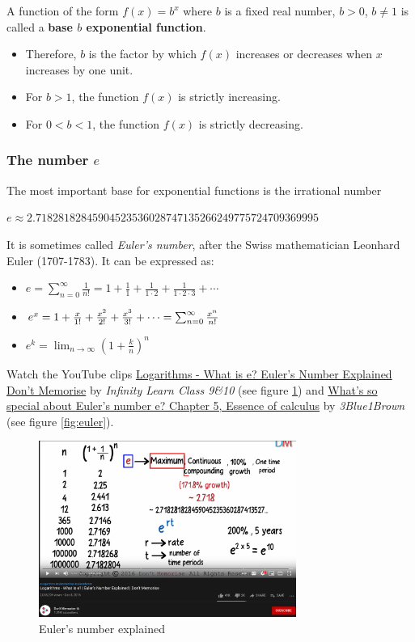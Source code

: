 \documentclass[
  12pt,
  oneside]{book}
\providecommand{\tightlist}{%
  \setlength{\itemsep}{0pt}\setlength{\parskip}{0pt}}
\theoremstyle{definition}
\theoremstyle{definition}
\theoremstyle{definition}
\theoremstyle{definition}
\theoremstyle{remark}
\begin{document}
A function of the form \(f(x) = b^{x}\) where \(b\) is a fixed real number, \(b > 0\), \(b \neq 1\) is called a \textbf{base \(b\) exponential function}.

\begin{itemize}
\tightlist
\item
  Therefore, \(b\) is the factor by which \(f(x)\) increases or decreases when \(x\) increases by one unit.
\item
  For \(b > 1\), the function \(f(x)\) is strictly increasing.
\item
  For \(0 < b < 1\), the function \(f(x)\) is strictly decreasing.
\end{itemize}

\subsubsection{\texorpdfstring{The number \(e\)}{The number e}}\label{the-number-e}

The most important base for exponential functions is the irrational number

\(e \approx 2.71828182845904523536028747135266249775724709369995\)

It is sometimes called \emph{Euler's number}, after the Swiss mathematician Leonhard Euler (1707-1783).
It can be expressed as:

\begin{itemize}
\item
  \(e = \sum \limits _{n=0}^{\infty }{\frac {1}{n!}} = 1+{\frac {1}{1}}+{\frac {1}{1\cdot 2}}+{\frac {1}{1\cdot 2\cdot 3}}+\cdots\)
\item
  \(e^{x} = 1+{x \over 1!}+{x^{2} \over 2!}+{x^{3} \over 3!}+\cdots = \sum _{n=0}^{\infty }{\frac {x^{n}}{n!}}\)
\item
  \(e^k = \lim _{n\to \infty }\left(1+{\frac {k}{n}}\right)^{n}\)
\end{itemize}

Watch the YouTube clips \href{https://youtu.be/_-x90wGBD8U}{Logarithms - What is e? \textbar{} Euler's Number Explained \textbar{} Don't Memorise} by \emph{Infinity Learn Class 9\&10} (see figure \ref{fig:whatse}) and \href{https://youtu.be/m2MIpDrF7Es}{What's so special about Euler's number e? \textbar{} Chapter 5, Essence of calculus} by \emph{3Blue1Brown} (see figure \ref{fig:euler}).

\begin{figure}
\centering
\includegraphics[width=0.75\textwidth,height=\textheight]{fig/whatse.png}
\caption{\label{fig:whatse} Euler's number explained}
\end{figure}
\end{document}
